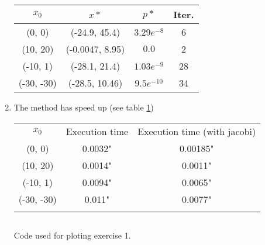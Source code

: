\documentclass[12pt, a4paper]{article}
\begin{document}
\begin{enumerate}[label={(\alph*)}, ref=\arabic*, leftmargin=0cm]
\begin{table}[H]
\centering
\begin{tabular}{c|c|c|c}
$x_0$                           & $x*$                                & $p*$                              & Iter.                  \\ \hline
(0, 0)                          & (-24.9, 45.4)                       & $3.29e^{-8}$                      & 6                      \\
(10, 20)                        & (-0.0047, 8.95)                     & $0.0$                             & 2                      \\
(-10, 1)                        & (-28.1, 21.4)                       & $1.03e^{-9}$                      & 28                     \\
(-30, -30)                      & (-28.5, 10.46)                      & $9.5e^{-10}$                      & 34                     \\
\end{tabular}
\end{table}

  \item The method has speed up (see table \ref{table:exercise1_times})

\begin{table}[H]
\centering
\begin{tabular}{c|c|c}
$x_0$      & Execution time & Execution time (with jacobi) \\
(0, 0)     & 0.0032"        & 0.00185" \\
(10, 20)   & 0.0014"        & 0.0011" \\
(-10, 1)   & 0.0094"        & 0.0065" \\
(-30, -30) & 0.011"         & 0.0077" \\
  \label{table:exercise1_times}
\end{tabular}
\end{table}

\begin{listing}[H]
  \inputminted[breaklines=true,fontsize=\footnotesize]{python}{../exercise1_plot.py}
  \label{lst:exercise1_plot}
  \caption{Code used for ploting exercise 1.}
\end{listing}

\begin{listing}[H]
  \inputminted[breaklines=true,fontsize=\footnotesize]{python}{../exercise1.py}
  \label{lst:exercise1}
  \caption{}
\end{listing}

\end{enumerate}
\end{document}
